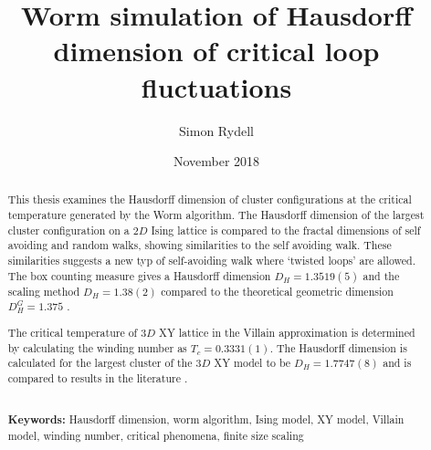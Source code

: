 \documentclass[nocoverpage,swedish,g5paper]{thesis}
\title{Worm simulation of Hausdorff dimension of critical loop fluctuations}
\author{Simon Rydell}
\date{November 2018}
\begin{document}

\begin{abstract}

This thesis examines the Hausdorff dimension of cluster configurations at the critical temperature generated by the Worm algorithm. The Hausdorff dimension of the largest cluster configuration on a $2D$ Ising lattice is compared to the fractal dimensions of self avoiding and random walks, showing similarities to the self avoiding walk. These similarities suggests a new typ of self-avoiding walk where `twisted loops' are allowed. The box counting measure \cite{strogatz:dynamics_chaos} gives a Hausdorff dimension $D_H = 1.3519(5)$ and the scaling method \cite{Hove:hausdorff_crit_fluctuations} $D_H = 1.38(2)$ compared to the theoretical geometric dimension $D_H^{G} = 1.375$ \cite{Duplantier:GeoHausdorff}.

The critical temperature of $3D$ XY lattice in the Villain approximation is determined by calculating the winding number as $T_c = 0.3331(1)$. The Hausdorff dimension is calculated for the largest cluster of the $3D$ XY model to be $D_H = 1.7747(8)$ and is compared to results in the literature \cite{Prokofev:comment_on_hove_hausdorff_crit_fluct}\cite{Hove:hausdorff_crit_fluctuations}.
\\ \noindent \strut \\
\textbf{Keywords:} Hausdorff dimension, worm algorithm, Ising model, XY model, Villain model, winding number, critical phenomena, finite size scaling

\newpage




\end{abstract}
\end{document}
